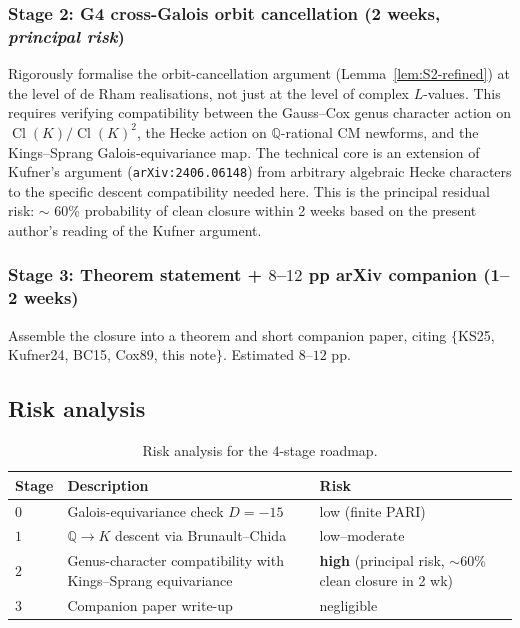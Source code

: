 \documentclass[11pt,a4paper]{amsart}
\theoremstyle{plain}
\theoremstyle{definition}
\DeclareMathOperator{\Cl}{Cl}
\newcommand{\Q}{\mathbb{Q}}
\begin{document}
\subsubsection*{Stage 2: G4 cross-Galois orbit cancellation (2 weeks,
\emph{principal risk})}

Rigorously formalise the orbit-cancellation argument
(Lemma~\ref{lem:S2-refined}) at the level of de Rham realisations,
not just at the level of complex $L$-values. This requires verifying
compatibility between the Gauss--Cox genus character action on
$\Cl(K)/\Cl(K)^2$, the Hecke action on $\Q$-rational CM newforms, and the
Kings--Sprang Galois-equivariance map. The technical core is an
extension of Kufner's argument \cite{Kufner2024} (\texttt{arXiv:2406.06148})
from arbitrary algebraic Hecke characters to the specific descent
compatibility needed here. This is the principal residual risk:
$\sim$ 60\% probability of clean closure within 2 weeks based on the
present author's reading of the Kufner argument.

\subsubsection*{Stage 3: Theorem statement + $8$--$12$ pp arXiv companion
(1--2 weeks)}

Assemble the closure into a theorem and short companion paper, citing
$\{$KS25, Kufner24, BC15, Cox89, this note$\}$. Estimated $8$--$12$
pp.

\subsection{Risk analysis}\label{ss:risk}

\begin{table}[h]
\centering
\caption{Risk analysis for the $4$-stage roadmap.}\label{tab:risk}
\begin{tabular}{lp{7.5cm}p{3.8cm}}
\toprule
Stage & Description & Risk \\
\midrule
$0$ & Galois-equivariance check $D=-15$
  & low (finite PARI) \\
$1$ & $\Q\to K$ descent via Brunault--Chida
  & low--moderate \\
$2$ & Genus-character compatibility with Kings--Sprang equivariance
  & \textbf{high} (principal risk, $\sim$60\% clean closure in 2 wk) \\
$3$ & Companion paper write-up
  & negligible \\
\bottomrule
\end{tabular}
\end{table}
\end{document}
